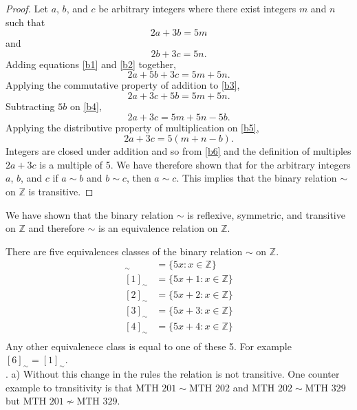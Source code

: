 \documentclass[12pt]{article}
\begin{document}
\begin{proof}
Let $a$, $b$, and $c$ be arbitrary integers where there exist integers $m$ and $n$ such that
\begin{equation}\label{b1}
2a + 3b = 5m
\end{equation}
and
\begin{equation}\label{b2}
2b + 3c = 5n.
\end{equation}
Adding equations \eqref{b1} and \eqref{b2} together,
\begin{equation}\label{b3}
2a + 5b +3c = 5m + 5n.
\end{equation}
Applying the commutative property of addition to \eqref{b3},
\begin{equation}\label{b4}
2a + 3c + 5b = 5m + 5n.
\end{equation}
Subtracting $5b$ on \eqref{b4},
\begin{equation}\label{b5}
2a + 3c = 5m + 5n - 5b.
\end{equation}
Applying the distributive property of multiplication on \eqref{b5},
\begin{equation}\label{b6}
2a + 3c = 5(m+n-b).
\end{equation}
Integers are closed under addition and so from \eqref{b6} and the definition of multiples $2a + 3c$ is a multiple of 5. We have therefore shown that for the arbitrary integers $a$, $b$, and $c$ if $a\sim b$ and $b\sim c$, then $a\sim c$. This implies that the binary relation $\sim$ on $\mathbb{Z}$ is transitive.
\end{proof}
We have shown that the binary relation $\sim$ is reflexive, symmetric, and transitive on $\mathbb{Z}$ and therefore $\sim$ is an equivalence relation on $\mathbb{Z}$.

There are five equivalences classes of the binary relation $\sim$ on $\mathbb{Z}$.
\begin{align*}
[0]_\sim &= \{5x: x \in \mathbb{Z}\}\\
[1]_\sim &= \{5x + 1: x \in \mathbb{Z}\}\\
[2]_\sim &= \{5x + 2: x \in \mathbb{Z}\}\\
[3]_\sim &= \{5x + 3: x \in \mathbb{Z}\}\\
[4]_\sim &= \{5x + 4: x \in \mathbb{Z}\}\\
\end{align*}
Any other equivalenece class is equal to one of these 5. For example $[6]_\sim = [1]_\sim$.\\

. a) Without this change in the rules the relation is not transitive. One counter example to transitivity is that $\text{MTH } 201\sim \text{MTH } 202$ and $\text{MTH } 202 \sim \text{MTH } 329$ but $\text{MTH } 201 \nsim \text{MTH } 329$.\\
\end{document}
